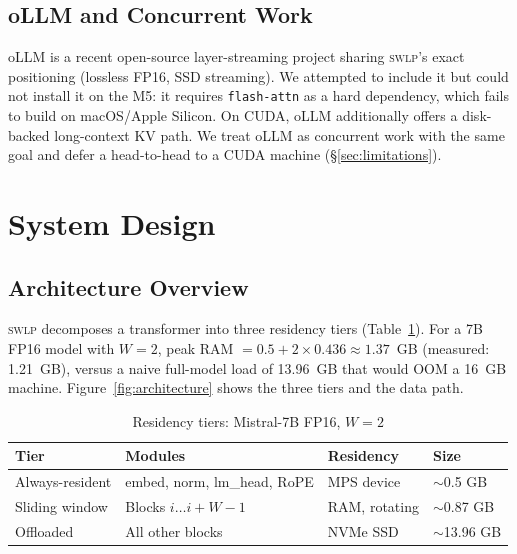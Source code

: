 \documentclass[10pt,a4paper]{article}
\newcommand{\swlp}{\textsc{swlp}}
\begin{document}
\subsection{oLLM and Concurrent Work}
oLLM \cite{ollm2025} is a recent open-source layer-streaming project sharing \swlp{}'s exact
positioning (lossless FP16, SSD streaming). We attempted to include it but could
not install it on the M5: it requires \texttt{flash-attn} as a hard dependency,
which fails to build on macOS/Apple Silicon. On CUDA, oLLM additionally offers a
disk-backed long-context KV path. We treat oLLM as concurrent work with the same
goal and defer a head-to-head to a CUDA machine (\S\ref{sec:limitations}).

\section{System Design}
\label{sec:design}

\subsection{Architecture Overview}
\label{subsec:arch}

\swlp{} decomposes a transformer into three residency tiers
(Table~\ref{tab:tiers}). For a 7B FP16 model with $W=2$, peak RAM
$= 0.5 + 2 \times 0.436 \approx 1.37$~GB (measured: 1.21~GB), versus a naive
full-model load of 13.96~GB that would OOM a 16~GB machine.
Figure~\ref{fig:architecture} shows the three tiers and the data path.

\begin{table}[htbp]
\centering
\caption{Residency tiers: Mistral-7B FP16, $W=2$}
\label{tab:tiers}
\begin{tabular}{@{}llll@{}}
\toprule
\textbf{Tier} & \textbf{Modules} & \textbf{Residency} & \textbf{Size} \\
\midrule
Always-resident & embed, norm, lm\_head, RoPE & MPS device & $\sim$0.5 GB \\
Sliding window & Blocks $i \ldots i+W-1$ & RAM, rotating & $\sim$0.87 GB \\
Offloaded & All other blocks & NVMe SSD & $\sim$13.96 GB \\
\bottomrule
\end{tabular}
\end{table}
\end{document}
